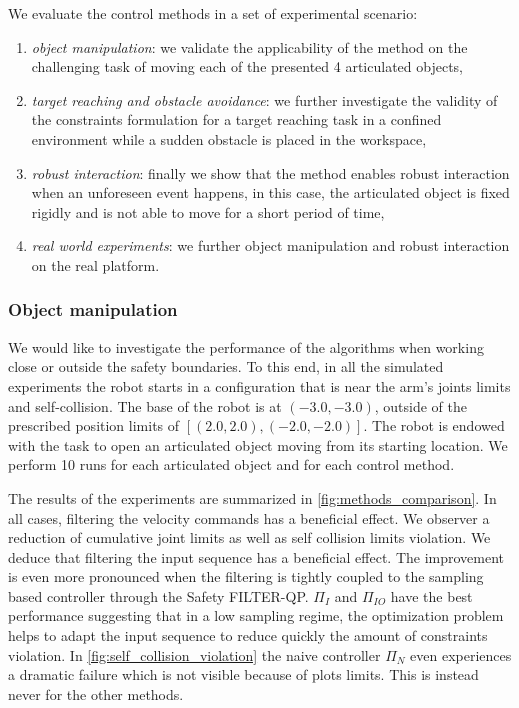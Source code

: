 We evaluate the control methods in a set of experimental scenario:
\begin{enumerate}
    \item \textit{object manipulation}: we validate the applicability of the method on the challenging task of moving each of the presented 4 articulated objects,   
    \item \textit{target reaching and obstacle avoidance}: we further investigate the validity of the constraints formulation for a target reaching task in a confined environment while a sudden obstacle is placed in the workspace,
    \item \textit{robust interaction}: finally we show that the method enables robust interaction when an unforeseen event happens, in this case, the articulated object is fixed rigidly and is not able to move for a short period of time,
    \item \textit{real world experiments}: we further object manipulation and robust interaction on the real platform. 
\end{enumerate}

\vspace{0.5cm}
\subsubsection{Object manipulation}
We would like to investigate the performance of the algorithms when working close or outside the safety boundaries. To this end, in all the simulated experiments the robot starts in a configuration that is near the arm's joints limits and self-collision. The base of the robot is at $(-3.0, -3.0)$, outside of the prescribed position limits of $[(2.0, 2.0), (-2.0, -2.0)]$. The robot is endowed with the task to open an articulated object moving from its starting location. We perform 10 runs for each articulated object and for each control method.

The results of the experiments are summarized in \fig \ref{fig:methods_comparison}. In all cases, filtering the velocity commands has a beneficial effect. We observer a reduction of cumulative joint limits as well as self collision limits violation. We deduce that filtering the input sequence has a beneficial effect. The improvement is even more pronounced when the filtering is tightly coupled to the sampling based controller through the Safety FILTER-QP. $\Pi_{I}$ and $\Pi_{IO}$ have the best performance suggesting that in a low sampling regime, the optimization problem helps to adapt the input sequence to reduce quickly the amount of constraints violation. In \fig \ref{fig:self_collision_violation} the naive controller $\Pi_{N}$ even experiences a dramatic failure which is not visible because of plots limits. This is instead never for the other methods. 

